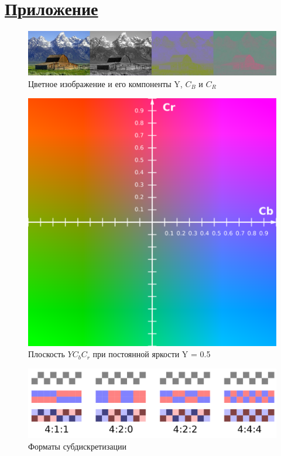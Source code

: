 \section*{\hyperlink{toc}{Приложение}}

\begin{figure}[H]
	\begin{center}
		\includegraphics[scale=0.35]{../pics/YCbCr/YCbCr_separation_h.jpg}
		\caption{Цветное изображение и его компоненты Y, $C_B$ и $C_R$} 
		\label{pic:YCbCr:separation}
	\end{center}
\end{figure}

\begin{figure}[H]
	\begin{center}
		\includegraphics[scale=0.5]{../pics/YCbCr/YCbCr.png}
		\caption{Плоскость $YC_bC_r$ при постоянной яркости Y = 0.5} 
		\label{pic:YCbCr:separation}
	\end{center}
\end{figure}

\begin{figure}[H]
	\begin{center}
		\includegraphics[scale=0.35]{../pics/chroma_subsampling/chroma_subsampling_ratios.png}
		\caption{Форматы субдискретизации} 
		\label{pic:chroma_subsampling}
	\end{center}
\end{figure}

